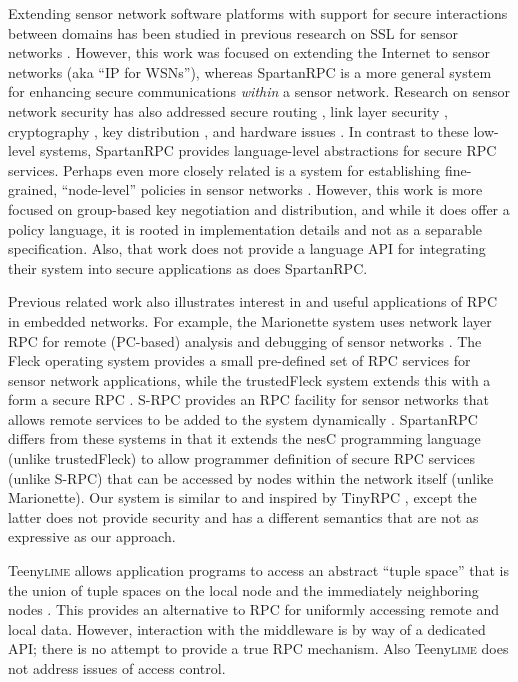 Extending sensor network software platforms with support for secure interactions between domains
has been studied in previous research on SSL for sensor networks \cite{10.1109/WAINA.2009.47}.
However, this work was focused on extending the Internet to sensor networks (aka ``IP for
WSNs''), whereas SpartanRPC is a more general system for enhancing secure communications
\emph{within} a sensor network. Research on sensor network security has also addressed secure
routing \cite{senroute-ahnj03}, link layer security \cite{karlog-tinysec-2004}, cryptography
\cite{bertoni-2006}, key distribution \cite{camtepe-bulent-05}, and hardware issues
\cite{perrig-2004}. In contrast to these low-level systems, SpartanRPC provides language-level
abstractions for secure RPC services. Perhaps even more closely related is a system for
establishing fine-grained, ``node-level'' policies in sensor networks
\cite{Claycomb:2011:NNL:1889383.1889450}. However, this work is more focused on group-based key
negotiation and distribution, and while it does offer a policy language, it is rooted in
implementation details and not as a separable specification. Also, that work does not provide a
language API for integrating their system into secure applications as does SpartanRPC.

Previous related work also illustrates interest in and useful applications of RPC in embedded
networks. For example, the Marionette system uses network layer RPC for remote (PC-based)
analysis and debugging of sensor networks \cite{whitehouse-marionette-2006}. The Fleck operating
system provides a small pre-defined set of RPC services for sensor network applications, while
the trustedFleck system extends this with a form a secure RPC
\cite{hu-secfleck-2009,Hu:2010:TTW:1806895.1806900}. S-RPC provides an RPC facility for sensor
networks that allows remote services to be added to the system dynamically \cite{5766863}.
SpartanRPC differs from these systems in that it extends the nesC programming language (unlike
trustedFleck) to allow programmer definition of secure RPC services (unlike S-RPC) that can be
accessed by nodes within the network itself (unlike Marionette). Our system is similar to and
inspired by TinyRPC \cite{may-tinyrpc-2007}, except the latter does not provide security and has
a different semantics that are not as expressive as our approach.

Teeny\textsc{lime} allows application programs to access an abstract ``tuple space'' that is the
union of tuple spaces on the local node and the immediately neighboring nodes
\cite{Costa:2007:PWS:1516124.1516153}. This provides an alternative to RPC for uniformly
accessing remote and local data. However, interaction with the middleware is by way of a
dedicated API; there is no attempt to provide a true RPC mechanism. Also Teeny\textsc{lime} does
not address issues of access control.

